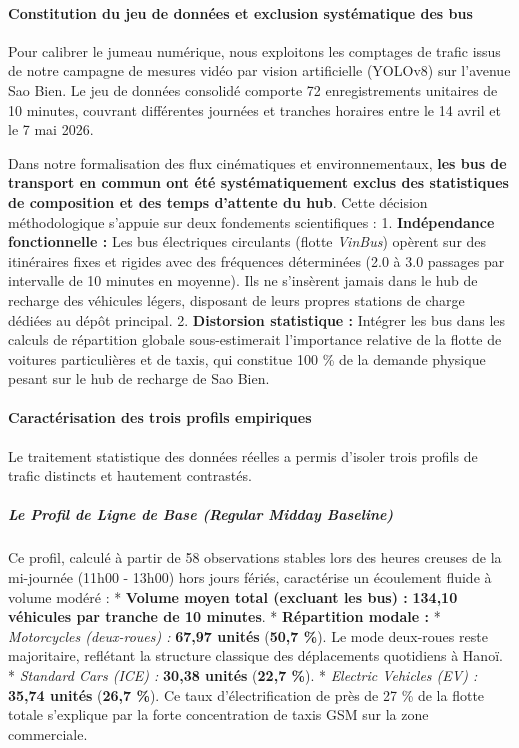 \documentclass[11pt, a4paper]{article}
\begin{document}
\paragraph{Constitution du jeu de données et exclusion systématique des
bus}\label{constitution-du-jeu-de-donnuxe9es-et-exclusion-systuxe9matique-des-bus}

Pour calibrer le jumeau numérique, nous exploitons les comptages de
trafic issus de notre campagne de mesures vidéo par vision artificielle
(YOLOv8) sur l'avenue Sao Bien. Le jeu de données consolidé comporte 72
enregistrements unitaires de 10 minutes, couvrant différentes journées
et tranches horaires entre le 14 avril et le 7 mai 2026.

Dans notre formalisation des flux cinématiques et environnementaux,
\textbf{les bus de transport en commun ont été systématiquement exclus
des statistiques de composition et des temps d'attente du hub}. Cette
décision méthodologique s'appuie sur deux fondements scientifiques : 1.
\textbf{Indépendance fonctionnelle :} Les bus électriques circulants
(flotte \emph{VinBus}) opèrent sur des itinéraires fixes et rigides avec
des fréquences déterminées (2.0 à 3.0 passages par intervalle de 10
minutes en moyenne). Ils ne s'insèrent jamais dans le hub de recharge
des véhicules légers, disposant de leurs propres stations de charge
dédiées au dépôt principal. 2. \textbf{Distorsion statistique :}
Intégrer les bus dans les calculs de répartition globale sous-estimerait
l'importance relative de la flotte de voitures particulières et de
taxis, qui constitue 100 \% de la demande physique pesant sur le hub de
recharge de Sao Bien.

\paragraph{Caractérisation des trois profils
empiriques}\label{caractuxe9risation-des-trois-profils-empiriques}

Le traitement statistique des données réelles a permis d'isoler trois
profils de trafic distincts et hautement contrastés.

\subparagraph{Le Profil de Ligne de Base (Regular Midday
Baseline)}\label{le-profil-de-ligne-de-base-regular-midday-baseline}

Ce profil, calculé à partir de 58 observations stables lors des heures
creuses de la mi-journée (11h00 - 13h00) hors jours fériés, caractérise
un écoulement fluide à volume modéré : * \textbf{Volume moyen total
(excluant les bus) :} \textbf{134,10 véhicules par tranche de 10
minutes}. * \textbf{Répartition modale :} * \emph{Motorcycles
(deux-roues) :} \textbf{67,97 unités} (\textbf{50,7 \%}). Le mode
deux-roues reste majoritaire, reflétant la structure classique des
déplacements quotidiens à Hanoï. * \emph{Standard Cars (ICE) :}
\textbf{30,38 unités} (\textbf{22,7 \%}). * \emph{Electric Vehicles (EV)
:} \textbf{35,74 unités} (\textbf{26,7 \%}). Ce taux d'électrification
de près de 27 \% de la flotte totale s'explique par la forte
concentration de taxis GSM sur la zone commerciale.
\end{document}
